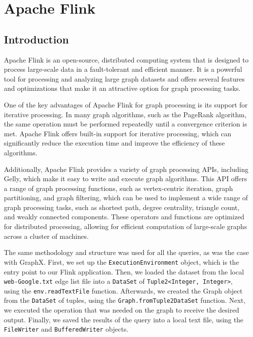 \documentclass[conference]{IEEEtran}
\begin{document}
\section{\textbf{Apache Flink}}\label{flink}

\subsection{Introduction}

Apache Flink \cite{b2} is an open-source, distributed computing system that is designed to process large-scale data in a fault-tolerant and efficient manner. It is a powerful tool for processing and analyzing large graph datasets and offers several features and optimizations that make it an attractive option for graph processing tasks.

One of the key advantages of Apache Flink for graph processing is its support for iterative processing. In many graph algorithms, such as the PageRank algorithm, the same operation must be performed repeatedly until a convergence criterion is met. Apache Flink offers built-in support for iterative processing, which can significantly reduce the execution time and improve the efficiency of these algorithms.

Additionally, Apache Flink provides a variety of graph processing APIs, including Gelly, which make it easy to write and execute graph algorithms. This API offers a range of graph processing functions, such as vertex-centric iteration, graph partitioning, and graph filtering, which can be used to implement a wide range of graph processing tasks, such as shortest path, degree centrality, triangle count, and weakly connected components. These operators and functions are optimized for distributed processing, allowing for efficient computation of large-scale graphs across a cluster of machines.

The same methodology and structure was used for all the queries, as was the case with GraphX. First, we set up the \verb|ExecutionEnvironment| object, which is the entry point to our Flink application. Then, we loaded the dataset from the local \verb|web-Google.txt| edge list file into a \verb|DataSet| of \verb|Tuple2<Integer, Integer>|, using the \verb|env.readTextFile| function. Afterwards, we created the Graph object from the \verb|DataSet| of tuples, using the \verb|Graph.fromTuple2DataSet| function. Next, we executed the operation that was needed on the graph to receive the desired output. Finally, we saved the results of the query into a local text file, using the \verb|FileWriter| and \verb|BufferedWriter| objects.
\end{document}
